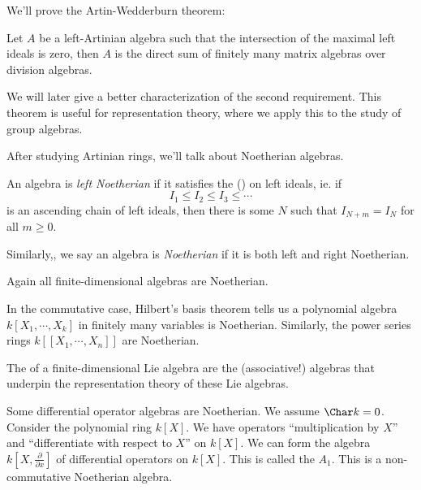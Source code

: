 \documentclass[a4paper]{article}
\begin{document}
We'll prove the Artin-Wedderburn theorem:
\begin{thm}
  Let $A$ be a left-Artinian algebra such that the intersection of the maximal left ideals is zero, then $A$ is the direct sum of finitely many matrix algebras over division algebras.
\end{thm}
We will later give a better characterization of the second requirement. This theorem is useful for representation theory, where we apply this to the study of group algebras.

After studying Artinian rings, we'll talk about Noetherian algebras.
\begin{defi}
  An algebra is \emph{left Noetherian} if it satisfies the  () on left ideals, ie. if
  \[
    I_1 \leq I_2 \leq I_3 \leq \cdots
  \]
  is an ascending chain of left ideals, then there is some $N$ such that $I_{N + m} = I_N$ for all $m \geq 0$.

  Similarly,, we say an algebra is \emph{Noetherian} if it is both left and right Noetherian.
\end{defi}

\begin{eg}
  Again all finite-dimensional algebras are Noetherian.
\end{eg}

\begin{eg}
  In the commutative case, Hilbert's basis theorem tells us a polynomial algebra $k[X_1, \cdots, X_k]$ in finitely many variables is Noetherian. Similarly, the power series rings $k[[X_1, \cdots, X_n]]$ are Noetherian.
\end{eg}

\begin{eg}
  The  of a finite-dimensional Lie algebra are the (associative!) algebras that underpin the representation theory of these Lie algebras.
\end{eg}

\begin{eg}
  Some differential operator algebras are Noetherian. We assume $\Char k = 0$. Consider the polynomial ring $k[X]$. We have operators ``multiplication by $X$'' and ``differentiate with respect to $X$'' on $k[X]$. We can form the algebra $k[X, \frac{\partial}{\partial x}]$ of differential operators on $k[X]$. This is called the  $A_1$. This is a non-commutative Noetherian algebra.
\end{eg}
\end{document}
